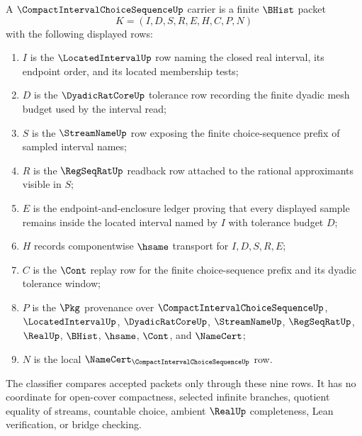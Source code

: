 \begin{definition}
\label{def:compact-interval-choice-sequence-carrier}
A $\CompactIntervalChoiceSequenceUp$ carrier is a finite $\BHist$ packet
$$
K=(I,D,S,R,E,H,C,P,N)
$$
with the following displayed rows:
\begin{enumerate}
\item $I$ is the $\LocatedIntervalUp$ row naming the closed real interval, its endpoint order, and its located membership tests;
\item $D$ is the $\DyadicRatCoreUp$ tolerance row recording the finite dyadic mesh budget used by the interval read;
\item $S$ is the $\StreamNameUp$ row exposing the finite choice-sequence prefix of sampled interval names;
\item $R$ is the $\RegSeqRatUp$ readback row attached to the rational approximants visible in $S$;
\item $E$ is the endpoint-and-enclosure ledger proving that every displayed sample remains inside the located interval named by $I$ with tolerance budget $D$;
\item $H$ records componentwise $\hsame$ transport for $I,D,S,R,E$;
\item $C$ is the $\Cont$ replay row for the finite choice-sequence prefix and its dyadic tolerance window;
\item $P$ is the $\Pkg$ provenance over $\CompactIntervalChoiceSequenceUp$, $\LocatedIntervalUp$, $\DyadicRatCoreUp$, $\StreamNameUp$, $\RegSeqRatUp$, $\RealUp$, $\BHist$, $\hsame$, $\Cont$, and $\NameCert$;
\item $N$ is the local $\NameCert_{\CompactIntervalChoiceSequenceUp}$ row.
\end{enumerate}
The classifier compares accepted packets only through these nine rows. It has no coordinate for open-cover compactness, selected infinite branches, quotient equality of streams, countable choice, ambient $\RealUp$ completeness, Lean verification, or bridge checking.
\end{definition}

